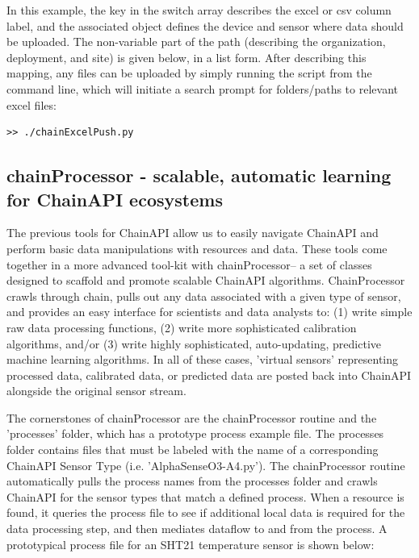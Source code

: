 In this example, the key in the switch array describes the excel or csv column label, and the associated object defines the device and sensor where data should be uploaded.  The non-variable part of the path (describing the organization, deployment, and site) is given below, in a list form.  After describing this mapping, any files can be uploaded by simply running the script from the command line, which will initiate a search prompt for folders/paths to relevant excel files:

\begin{lstlisting}[style=code]
>> ./chainExcelPush.py
\end{lstlisting}

\subsection{chainProcessor - scalable, automatic learning for ChainAPI ecosystems}

The previous tools for ChainAPI allow us to easily navigate ChainAPI and perform basic data manipulations with resources and data.  These tools come together in a more advanced tool-kit with chainProcessor-- a set of classes designed to scaffold and promote scalable ChainAPI algorithms.  ChainProcessor crawls through chain, pulls out any data associated with a given type of sensor, and provides an easy interface for scientists and data analysts to: (1) write simple raw data processing functions, (2) write more sophisticated calibration algorithms, and/or (3) write highly sophisticated, auto-updating, predictive machine learning algorithms.  In all of these cases, 'virtual sensors' representing processed data, calibrated data, or predicted data are posted back into ChainAPI alongside the original sensor stream.

The cornerstones of chainProcessor are the chainProcessor routine and the 'processes' folder, which has a prototype process example file.  The processes folder contains files that must be labeled with the name of a corresponding ChainAPI Sensor Type (i.e. 'AlphaSenseO3-A4.py').  The chainProcessor routine automatically pulls the process names from the processes folder and crawls ChainAPI for the sensor types that match a defined process.  When a resource is found, it queries the process file to see if additional local data is required for the data processing step, and then mediates dataflow to and from the process.  A prototypical process file for an SHT21 temperature sensor is shown below:


